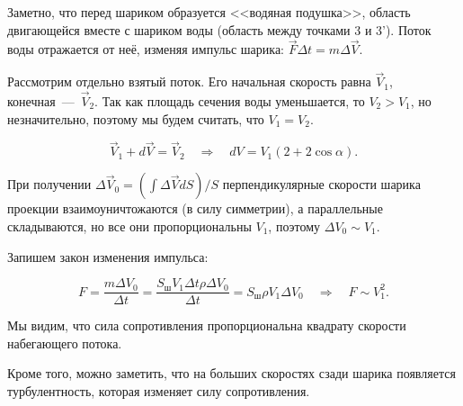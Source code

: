 Заметно, что перед шариком образуется <<водяная подушка>>, область
двигающейся вместе с шариком воды (область между точками 3 и
3'). Поток воды отражается от неё, изменяя импульс шарика: $\vec{F}
\Delta t = m \Delta \vec{V}$. 


Рассмотрим отдельно взятый поток. Его начальная скорость равна
$\vec{V}_1$, конечная~---~$\vec{V}_2$. Так как площадь сечения воды
уменьшается, то $V_2 > V_1$, но незначительно, поэтому мы будем
считать, что $V_1 = V_2$. 

\begin{equation}
  \label{eq:bz_3}
  \vec{V}_1 + d\vec{V} = \vec{V}_2 \quad \Rightarrow \quad dV = V_1 (2 + 2 \cos
  \alpha). 
\end{equation}

При получении $\Delta \vec{V}_0 = \left(\int \Delta \vec{V}  dS \right)
/S$ перпендикулярные скорости шарика проекции взаимоуничтожаются (в
силу симметрии), а параллельные складываются, но все они
пропорциональны $V_1$, поэтому $\Delta V_0 \sim V_1$. 

Запишем закон изменения импульса: 

\begin{equation}
  \label{eq:bz_4}
  F = \frac{m \Delta V_0}{\Delta t} = \frac{S_{\mbox{ш}} V_1 \Delta t
    \rho \Delta V_0}{\Delta t} = S_{\mbox{ш}} \rho V_1 \Delta V_0 \quad
  \Rightarrow \quad F \sim V_1^2.
\end{equation}

Мы видим, что сила сопротивления пропорциональна квадрату скорости
набегающего потока. 

Кроме того, можно заметить, что на больших скоростях сзади шарика
появляется турбулентность, которая изменяет силу сопротивления. 